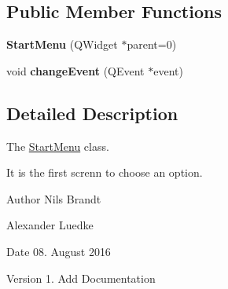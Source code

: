 \subsection*{Public Member Functions}
\begin{DoxyCompactItemize}
\item 
\hypertarget{classStartMenu_a1491fb2672b951483f3cfc0594571fbb}{{\bfseries Start\-Menu} (Q\-Widget $\ast$parent=0)}\label{classStartMenu_a1491fb2672b951483f3cfc0594571fbb}

\item 
\hypertarget{classStartMenu_afc4a48db40567e80c6514b0af30d3797}{void {\bfseries change\-Event} (Q\-Event $\ast$event)}\label{classStartMenu_afc4a48db40567e80c6514b0af30d3797}

\end{DoxyCompactItemize}


\subsection{Detailed Description}
The \hyperlink{classStartMenu}{Start\-Menu} class. 

It is the first screnn to choose an option.

\begin{DoxyAuthor}{Author}
Nils Brandt 

Alexander Luedke
\end{DoxyAuthor}
\begin{DoxyDate}{Date}
08. August 2016
\end{DoxyDate}
\begin{DoxyVersion}{Version}
1. Add Documentation 
\end{DoxyVersion}
